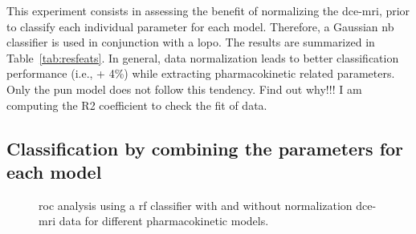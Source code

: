 This experiment consists in assessing the benefit of normalizing the \ac{dce}-\ac{mri}, prior to classify each individual parameter for each model.
Therefore, a Gaussian \ac{nb} classifier is used in conjunction with a \ac{lopo}.
The results are summarized in Table~\ref{tab:resfeats}.
In general, data normalization leads to better classification performance (i.e., + 4\%) while extracting pharmacokinetic related parameters.
Only the \ac{pun} model does not follow this tendency.
{\color{red} Find out why!!! I am computing the R2 coefficient to check the fit of data.}

\subsection{Classification by combining the parameters for each model}

\begin{figure}
  \centering
  \hspace*{\fill}
   \hfill
  \hspace*{\fill}
  \caption{\acs*{roc} analysis using a \acs*{rf} classifier with and without normalization \ac{dce}-\ac{mri} data for different pharmacokinetic models.}
  \label{fig:normpharmarf}
\end{figure}

